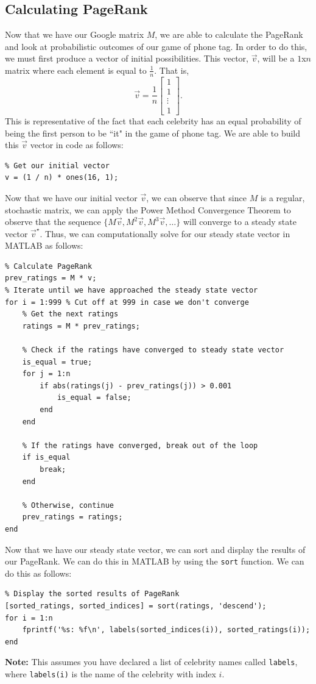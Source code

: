 \documentclass[11pt]{article}
\begin{document}
      \subsection{Calculating PageRank}
      Now that we have our Google matrix $M$, we are able to calculate the PageRank and look at probabilistic outcomes of our game of phone tag.
      In order to do this, we must first produce a vector of initial possibilities.  
      This vector, $\overrightarrow{v}$, will be a $1$x$n$ matrix where each element is equal to $\frac{1}{n}$.
      That is, 
      \[
        \overrightarrow{v} = \frac{1}{n}
        \begin{bmatrix}
          1 \\
          1 \\
          \vdots \\
          1
        \end{bmatrix}.
      \]
      This is representative of the fact that each celebrity has an equal probability of being the first person to be ``it" in the game of phone tag.
      We are able to build this $\overrightarrow{v}$ vector in code as follows:
\begin{lstlisting}
% Get our initial vector
v = (1 / n) * ones(16, 1);
\end{lstlisting}
      Now that we have our initial vector $\overrightarrow{v}$, we can observe that since $M$ is a regular, stochastic matrix, we can apply the Power Method Convergence Theorem to observe that the sequence $ \{ M\overrightarrow{v}, M^2\overrightarrow{v}, M^3\overrightarrow{v}, \dots\}$ will converge to a steady state vector $\overrightarrow{v}^{\star}$.
      Thus, we can computationally solve for our steady state vector in MATLAB as follows:
\begin{lstlisting}
% Calculate PageRank
prev_ratings = M * v;
% Iterate until we have approached the steady state vector
for i = 1:999 % Cut off at 999 in case we don't converge
    % Get the next ratings
    ratings = M * prev_ratings;

    % Check if the ratings have converged to steady state vector
    is_equal = true;
    for j = 1:n
        if abs(ratings(j) - prev_ratings(j)) > 0.001
            is_equal = false;
        end
    end

    % If the ratings have converged, break out of the loop
    if is_equal
        break;
    end

    % Otherwise, continue
    prev_ratings = ratings;
end
\end{lstlisting}
      Now that we have our steady state vector, we can sort and display the results of our PageRank.
      We can do this in MATLAB by using the \texttt{sort} function.  
      We can do this as follows:
\begin{lstlisting}
% Display the sorted results of PageRank
[sorted_ratings, sorted_indices] = sort(ratings, 'descend');
for i = 1:n
    fprintf('%s: %f\n', labels(sorted_indices(i)), sorted_ratings(i));
end
\end{lstlisting}
      \textbf{Note:} This assumes you have declared a list of celebrity names called \texttt{labels}, where \texttt{labels(i)} is the name of the celebrity with index $i$.
      \\
\end{document}
